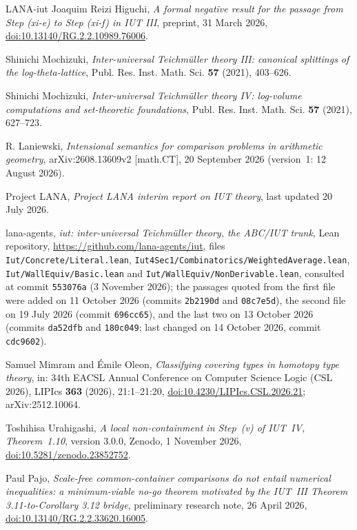 \documentclass[11pt,a4paper]{article}
\theoremstyle{plain}
\theoremstyle{definition}
\theoremstyle{remark}
\begin{document}
\begin{thebibliography}{LANA-iut}
Joaquim Reizi Higuchi, \emph{A formal negative result for the passage from {S}tep (xi-e) to {S}tep (xi-f) in {IUT}
{III}}, preprint, 31 March 2026,
\href{https://doi.org/10.13140/RG.2.2.10989.76006}{doi:10.13140/RG.2.2.10989.76006}.

Shinichi Mochizuki, \emph{Inter-universal {T}eichm\"uller theory {III}: canonical splittings of the log-theta-lattice},
Publ. Res. Inst. Math. Sci. \textbf{57} (2021), 403--626.

Shinichi Mochizuki, \emph{Inter-universal {T}eichm\"uller theory {IV}: log-volume computations and set-theoretic
foundations}, Publ. Res. Inst. Math. Sci. \textbf{57} (2021), 627--723.

R. Laniewski, \emph{Intensional semantics for comparison problems in arithmetic geometry}, arXiv:2608.13609v2
[math.CT], 20 September 2026 (version~1: 12 August 2026).

Project LANA, \emph{Project LANA interim report on IUT theory}, last updated 20 July 2026.

lana-agents, \emph{iut: inter-universal {T}eichm\"uller theory, the ABC/IUT trunk}, Lean repository,
\url{https://github.com/lana-agents/iut}, files \texttt{Iut/Concrete/Literal.lean},
\texttt{Iut4Sec1/Combinatorics/WeightedAverage.lean}, \texttt{Iut/WallEquiv/Basic.lean} and
\texttt{Iut/WallEquiv/NonDerivable.lean}, consulted at commit \texttt{553076a} (3 November 2026); the passages
quoted from the first file were added on 11 October 2026 (commits \texttt{2b2190d} and \texttt{08c7e5d}), the second
file on 19 July 2026 (commit \texttt{696cc65}), and the last two on 13 October 2026 (commits \texttt{da52dfb} and
\texttt{180c049}; last changed on 14 October 2026, commit \texttt{cdc9602}).

Samuel Mimram and \'Emile Oleon, \emph{Classifying covering types in homotopy type theory}, in: 34th EACSL Annual Conference
on Computer Science Logic (CSL 2026), LIPIcs \textbf{363} (2026), 21:1--21:20,
\href{https://doi.org/10.4230/LIPIcs.CSL.2026.21}{doi:10.4230/LIPIcs.CSL.2026.21}; arXiv:2512.10064.

Toshihisa Urahigashi, \emph{A local non-containment in Step~(v) of {IUT}~{IV}, Theorem~1.10}, version 3.0.0, Zenodo,
1 November 2026, \href{https://doi.org/10.5281/zenodo.23852752}{doi:10.5281/zenodo.23852752}.

Paul Pajo, \emph{Scale-free common-container comparisons do not entail numerical inequalities: a minimum-viable no-go
theorem motivated by the {IUT}~{III} {T}heorem 3.11-to-{C}orollary 3.12 bridge}, preliminary research note,
26 April 2026, \href{https://doi.org/10.13140/RG.2.2.33620.16005}{doi:10.13140/RG.2.2.33620.16005}.


\end{thebibliography}
\end{document}
